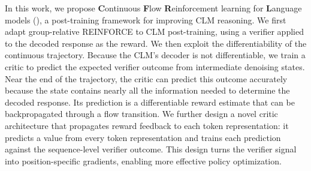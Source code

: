 In this work, we propose \textbf{C}ontinuous \textbf{F}low \textbf{R}einforcement learning for \textbf{L}anguage models (\method{}), 
a post-training framework for improving CLM reasoning. We first adapt group-relative REINFORCE \citep{yao2026grouprelative}
to CLM post-training, using a verifier applied to the decoded response as the reward. We then exploit the differentiability
of the continuous trajectory. Because the CLM's decoder is not differentiable, we train a critic to predict the expected verifier
outcome from intermediate denoising states. Near the end of the trajectory,
the critic can predict this outcome accurately because the state contains nearly all the information needed to determine
the decoded response. Its prediction is a differentiable reward estimate that can be backpropagated through a flow
transition. We further design a novel critic architecture that propagates reward feedback to each token representation:
it predicts a value from every token representation and trains each prediction against the sequence-level verifier outcome.
This design turns the verifier signal into position-specific gradients, enabling more effective policy optimization.





